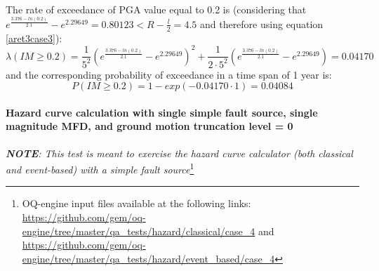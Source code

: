 The rate of exceedance of PGA value equal to 0.2 is (considering that $e^{\frac{3.376 - ln(0.2)}{2.1}} - e^{2.29649} = 0.80123 < R - \frac{l}{2} = 4.5$ and therefore using equation \ref{aret3case3}):
\begin{equation}
\lambda(IM \geq 0.2) = \frac{1}{5^{2}} (e^{\frac{3.376 - ln(0.2)}{2.1}} - e^{2.29649})^{2} + \frac{1}{2\cdot 5^{2}}(e^{\frac{3.376 - ln(0.2)}{2.1}} - e^{2.29649}) = 0.04170
\end{equation}
and the corresponding probability of exceedance in a time span of 1 year is:
\begin{equation}
P(IM \geq 0.2) = 1 - exp(-0.04170 \cdot 1) = 0.04084
\end{equation}
%
\clearpage
%
\paragraph{Hazard curve calculation with single simple
fault source, single magnitude MFD, and ground motion truncation level = 0} 
\textit{\textbf{NOTE}:
This test is meant to exercise the hazard curve calculator (both classical and
event-based) with a simple fault source}\footnote{
    OQ-engine input files available at the following links:
    \url{https://github.com/gem/oq-engine/tree/master/qa_tests/hazard/classical/case_4}
    and 
    \url{https://github.com/gem/oq-engine/tree/master/qa_tests/hazard/event_based/case_4}}

